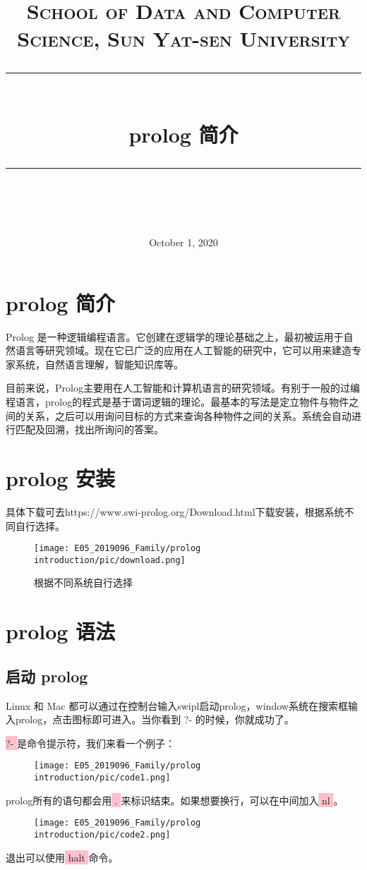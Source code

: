 \documentclass[a4paper, 11pt]{article}
\title{	
\normalfont \normalsize
\textsc{School of Data and Computer Science, Sun Yat-sen University} \\ [25pt] %
\rule{\textwidth}{0.5pt} \\[0.4cm] %
\huge  prolog  简介 \\ %
\rule{\textwidth}{2pt} \\[0.5cm] %
\date{\normalsize October 1, 2020} 
}
\begin{document}
\maketitle
\tableofcontents
\newpage

\section{prolog 简介}
Prolog 是一种逻辑编程语言。它创建在逻辑学的理论基础之上，最初被运用于自然语言等研究领域。现在它已广泛的应用在人工智能的研究中，它可以用来建造专家系统，自然语言理解，智能知识库等。

目前来说，Prolog主要用在人工智能和计算机语言的研究领域。有别于一般的过编程语言，prolog的程式是基于谓词逻辑的理论。最基本的写法是定立物件与物件之间的关系，之后可以用询问目标的方式来查询各种物件之间的关系。系统会自动进行匹配及回溯，找出所询问的答案。

\section{prolog 安装}
具体下载可去https://www.swi-prolog.org/Download.html下载安装，根据系统不同自行选择。
\begin{figure}[ht]
\centering
\texttt{[image: E05\_2019096\_Family/prolog introduction/pic/download.png]}
\caption{根据不同系统自行选择}
\label{fig:label}
\end{figure}

\section{prolog 语法}
\subsection{启动 prolog}
Linux 和 Mac 都可以通过在控制台输入swipl启动prolog，window系统在搜索框输入prolog，点击图标即可进入。当你看到 ?- 的时候，你就成功了。

\colorbox{pink}{\color{black} ?- }是命令提示符，我们来看一个例子：
\begin{figure}[ht]
\centering
\texttt{[image: E05\_2019096\_Family/prolog introduction/pic/code1.png]}
\label{fig:label}
\end{figure}

prolog所有的语句都会用\colorbox{pink}{\color{black} . }
来标识结束。如果想要换行，可以在中间加入\colorbox{pink}{\color{black} nl }。
\begin{figure}[ht]
\centering
\texttt{[image: E05\_2019096\_Family/prolog introduction/pic/code2.png]}
\label{fig:label}
\end{figure}
退出可以使用\colorbox{pink}{\color{black} halt }命令。
\end{document}
